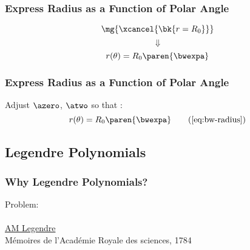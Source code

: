 

\begin{frame}\frametitle{Express Radius as a Function of Polar Angle}
%
\begin{equation}
	\mg{\xcancel{\bk{r = R_{0}}}}
\end{equation}
$$ \Downarrow $$
\begin{equation}
	r(\theta) = R_{0}\paren{\bwexpa}
\label{eq:bw-radius}
\end{equation}
\end{frame}

\begin{frame}\frametitle{Express Radius as a Function of Polar Angle\jumpLittle}
%
Adjust $ \azero$, $ \atwo$ so that :
\begin{equation}
	r(\theta) = R_{0}\paren{\bwexpa}
\tag{\ref{eq:bw-radius}}
\end{equation}
\end{frame}

\subsection{Legendre Polynomials}
\begin{frame}\frametitle{Why Legendre Polynomials?}
	Problem: \\[10pt]
	\\[10pt]
\href{Adrien-Marie Legendre}{AM Legendre}\\
Mémoires de l'Acad\'emie Royale des sciences, 1784
\end{frame}


